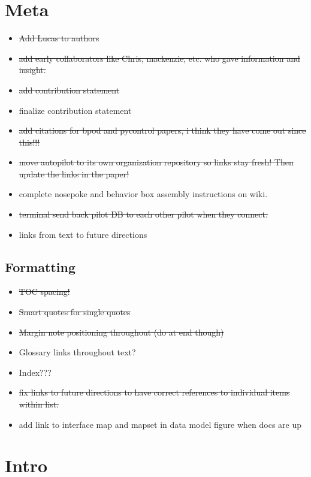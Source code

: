\section{Meta}

\begin{itemize}
\item \sout{Add Lucas to authors}
\item \sout{add early collaborators like Chris, mackenzie, etc. who gave information and insight.}
\item \sout{add contribution statement}
\item finalize contribution statement
\item \sout{add citations for bpod and pycontrol papers, i think they have come out since this!!!}
\item \sout{move autopilot to its own organization repository so links stay fresh! Then update the links in the paper!}
\item complete nosepoke and behavior box assembly instructions on wiki.
\item \sout{terminal send back pilot DB to each other pilot when they connect.}
\item links from text to future directions
\end{itemize}

\subsection{Formatting}

\begin{itemize}
\item \sout{TOC spacing!}
\item \sout{Smart quotes for single quotes}
\item \sout{Margin note positioning throughout (do at end though)}
\item Glossary links throughout text?
\item Index???
\item \sout{fix links to future directions to have correct references to individual items within list.}
\item add link to interface map and mapset in data model figure when docs are up
\end{itemize}

\section{Intro}

